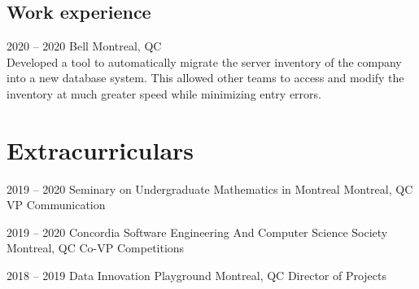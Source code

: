 \documentclass[]{friggeri-cv} %
\begin{document}
\subsection{Work experience}

\begin{entrylist}
																											
																											
	\entry
	{2020 -- 2020}
	{Bell}
	{Montreal, QC}
	{ \\
		Developed a tool to automatically migrate the server inventory of the 
		company into a new database system. This allowed other teams to access 
		and modify the inventory at much greater speed while minimizing entry 
		errors.
	}
																											
																											
\end{entrylist}



\section{Extracurriculars}
\begin{entrylist}
																											
																											
	\entry
	{2019 -- 2020}
	{Seminary on Undergraduate Mathematics in Montreal}
	{Montreal, QC}
	{VP Communication}
																											
																											
	\entry
	{2019 -- 2020}
	{Concordia Software Engineering And Computer Science Society}
	{Montreal, QC}
	{Co-VP Competitions}
																											
																											
	\entry
	{2018 -- 2019}
	{Data Innovation Playground}
	{Montreal, QC}
	{Director of Projects}
																											
																											
\end{entrylist}
\end{document}
